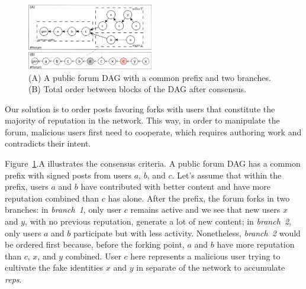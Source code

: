 \documentclass[10pt,journal,compsoc]{IEEEtran}
\newcommand{\reps}     {\emph{reps}\xspace}
\begin{document}
\begin{figure}
\centering
\includegraphics[width=0.49\textwidth]{reps2.png}
\caption{
    (A) A public forum DAG with a common prefix and two branches.
    (B) Total order between blocks of the DAG after consensus.
}
\label{fig.reps}
\end{figure}

Our solution is to order posts favoring forks with users that constitute the
majority of reputation in the network.
This way, in order to manipulate the forum, malicious users first need to
cooperate, which requires authoring work and contradicts their intent.

Figure~\ref{fig.reps}.A illustrates the consensus criteria.
A public forum DAG has a common prefix with signed posts from users $a$, $b$,
and $c$.
Let's assume that within the prefix, users $a$ and $b$ have contributed with
better content and have more reputation combined than $c$ has alone.
%
After the prefix, the forum forks in two branches:
in \emph{branch~1}, only user $c$ remains active and we see that new users $x$
and $y$, with no previous reputation, generate a lot of new content;
in \emph{branch~2}, only users $a$ and $b$ participate but with less activity.
Nonetheless, \emph{branch~2} would be ordered first because, before the forking
point, $a$ and $b$ have more reputation than $c$, $x$, and $y$ combined.
%
User $c$ here represents a malicious user trying to cultivate the fake
identities $x$ and $y$ in separate of the network to accumulate \reps.
\end{document}
